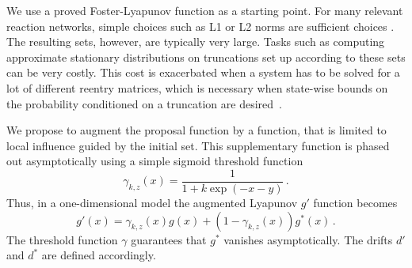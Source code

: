 We use a proved Foster-Lyapunov function as a starting point.
For many relevant reaction networks, simple choices such as L1 or L2 norms are sufficient choices \parencite{spieler2014numerical}.
The resulting sets, however, are typically very large.
Tasks such as computing approximate stationary distributions on truncations set up according to these sets can be very costly.
This cost is exacerbated when a system has to be solved for a lot of different reentry matrices, which is necessary when state-wise bounds on the probability conditioned on a truncation are desired~\parencite{dayar2011bounding}.

We propose to augment the proposal function by a function, that is limited to local influence guided by the initial set.
This supplementary function is phased out asymptotically using a simple sigmoid threshold function
\begin{equation}\label{eq:threshold}
  \gamma_{k,z}(x) = \frac{1}{1+k\exp(-x - y)}\,.
\end{equation}
Thus, in a one-dimensional model the augmented Lyapunov $g'$ function becomes
\begin{equation}\label{eq:thres_lyapunov}
    g'(x) = \gamma_{k,z}(x) g(x) + (1 - \gamma_{k,z}(x)) g^*(x)\,.
\end{equation}
The threshold function $\gamma$ guarantees that $g^*$ vanishes asymptotically.
The drifts $d'$ and $d^*$ are defined accordingly.

